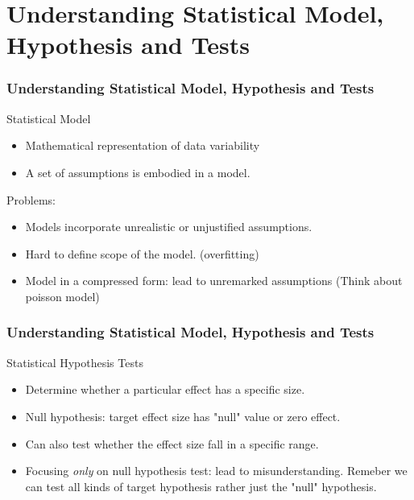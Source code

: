 \documentclass{beamer}
\begin{document}
\section{Understanding Statistical Model, Hypothesis and Tests}
\begin{frame}
\frametitle{Understanding Statistical Model, Hypothesis and Tests}

\begin{block}{Statistical Model}
\begin{itemize}
 \item Mathematical representation of data variability 
 \item A set of assumptions is embodied in a model. 
\end{itemize}
\end{block}
\pause
\begin{block}{Problems:}
\begin{itemize}
 \item Models incorporate unrealistic or unjustified assumptions. 
 \item Hard to define scope of the model. (overfitting)
 \item Model in a compressed form: lead to unremarked assumptions (Think about poisson model)
\end{itemize}
\end{block}

\end{frame}


\begin{frame}
\frametitle{Understanding Statistical Model, Hypothesis and Tests}
\begin{block}{Statistical Hypothesis Tests}
\begin{itemize}
 \item Determine whether a particular effect has a specific size.
 \item Null hypothesis: target effect size has "null" value or zero effect. 
 \item Can also test whether the effect size fall in a specific range. 
 \item Focusing \textit{only} on null hypothesis test: lead to misunderstanding. Remeber we can test all kinds of target hypothesis rather just the "null" hypothesis. 
\end{itemize}
\end{block}

\begin{block}{}

\end{block}

\end{frame}
\end{document}
